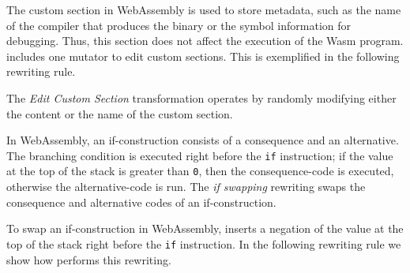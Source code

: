 The custom section in WebAssembly is used to store metadata, such as the name of the compiler that produces the binary or the symbol information for debugging.
Thus, this section does not affect the execution of the Wasm program.
\tool includes one mutator to edit custom sections. 
This is exemplified in the following rewriting rule. 



The \emph{Edit Custom Section} transformation operates by randomly modifying either the content or the name of the custom section. 




 In WebAssembly, an if-construction consists of a consequence and an alternative. The branching condition is executed right before the \texttt{if} instruction; if the value at the top of the stack is greater than \texttt{0}, then the consequence-code is executed, otherwise the alternative-code is run.
The \emph{if swapping} rewriting swaps the consequence and alternative codes of an if-construction.



To swap an if-construction in WebAssembly, \tool inserts a negation of the value at the top of the stack right before the \texttt{if} instruction.
In the following rewriting rule we show how \tool performs this rewriting.



